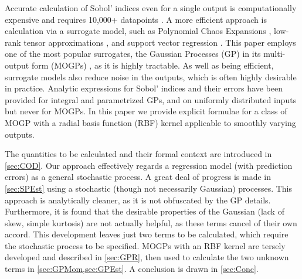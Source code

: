 \documentclass[preprint,12pt]{elsarticle}
\begin{document}
Accurate calculation of Sobol' indices even for a single output is computationally expensive and requires 10,000+ datapoints \cite{Lamoureux.etal2014}. A more efficient approach is calculation via a surrogate model, such as Polynomial Chaos Expansions \cite{Ghanem.Spanos1997,Xiu.Karniadakis2002,Xiu2010}, low-rank tensor approximations \cite{Chevreuil.etal2015,Konakli.Sudret2016}, and support vector regression \cite{Cortes.Vapnik1995}. This paper employs one of the most popular surrogates, the Gaussian Processes (GP) \cite{Sacks.etal1989, Rasmussen.Williams2005} in its multi-output form (MOGPs) \cite{Alvarez.etal2011}, as it is highly tractable. As well as being efficient, surrogate models also reduce noise in the outputs, which is often highly desirable in practice. Analytic expressions for Sobol' indices and their errors have been provided for integral \cite{Oakley.OHagan2004,Jin.etal2004} and parametrized \cite{Marrel.etal2009} GPs, and on uniformly distributed inputs \cite{Wu.etal2016a,Srivastava.etal2017} but never for MOGPs. In this paper we provide explicit formulae for a class of MOGP with a radial basis function (RBF) kernel applicable to smoothly varying outputs.

The quantities to be calculated and their formal context are introduced in \cref{sec:COD}. Our approach effectively regards a regression model (with prediction errors) as a general stochastic process. A great deal of progress is made in \cref{sec:SPEst} using a stochastic (though not necessarily Gaussian) processes. This approach is analytically cleaner, as it is not obfuscated by the GP details. Furthermore, it is found that the desirable properties of the Gaussian (lack of skew, simple kurtosis) are not actually helpful, as these terms cancel of their own accord. This development leaves just two terms to be calculated, which require the stochastic process to be specified. MOGPs with an RBF kernel are tersely developed and described in \cref{sec:GPR}, then used to calculate the two unknown terms in \cref{sec:GPMom,sec:GPEst}. A conclusion is drawn in \cref{sec:Conc}.
\end{document}
